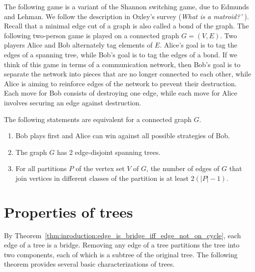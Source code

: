 The following game is a variant of the Shannon switching game, due to
Edmunds and Lehman. We follow the description
in Oxley's survey ({\it What is a matroid?'}
{\color{red}{add reference later}}). Recall that a minimal edge cut of
a graph is also called a bond of the graph. The following
two-person game is played on a connected graph $G = (V,E)$. Two
players Alice and Bob alternately tag elements of $E$. Alice's goal is
to tag the edges of a spanning tree, while Bob's goal is to tag the
edges of a bond. If we think of this game in terms of a communication
network, then Bob's goal is to separate the network into pieces that
are no longer connected to each other, while Alice is aiming to
reinforce edges of the network to prevent their destruction. Each move
for Bob consists of destroying one edge, while each move for Alice
involves securing an edge against destruction.

\begin{theorem}
The following statements are equivalent for a connected graph $G$.
%
\begin{enumerate}
\item Bob plays first and Alice can win against all possible
  strategies of Bob.

\item The graph $G$ has 2 edge-disjoint spanning trees.

\item For all partitions $P$ of the vertex set $V$ of $G$, the number
  of edges of $G$ that join vertices in different classes of the
  partition is at least $2(|P| - 1)$.
\end{enumerate}
\end{theorem}



\section{Properties of trees}

By Theorem~\ref{thm:inroduction:edge_is_bridge_iff_edge_not_on_cycle},
each edge of a tree is a bridge. Removing any edge of a tree
partitions the tree into two components, each of which is a subtree of
the original tree. The following theorem provides several basic
characterizations of trees.

